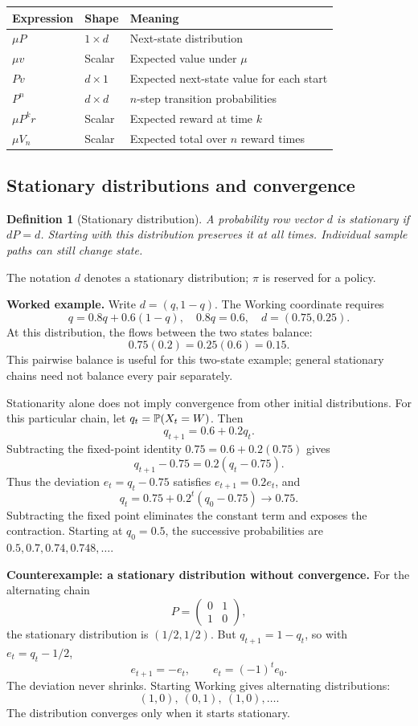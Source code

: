 \documentclass[11pt]{article}
\newtheorem{definition}{Definition}[section]
\theoremstyle{remark}\newtheorem{remark}[definition]{Remark}
\begin{document}
\begin{center}\small
\begin{tabular}{@{}lll@{}}\toprule
Expression & Shape & Meaning\\\midrule
$\mu P$ & $1\times d$ & Next-state distribution\\
$\mu v$ & Scalar & Expected value under $\mu$\\
$Pv$ & $d\times1$ & Expected next-state value for each start\\
$P^n$ & $d\times d$ & $n$-step transition probabilities\\
$\mu P^kr$ & Scalar & Expected reward at time $k$\\
$\mu V_n$ & Scalar & Expected total over $n$ reward times\\\bottomrule
\end{tabular}\end{center}

\clearpage
\subsection{Stationary distributions and convergence}
\begin{definition}[Stationary distribution]
A probability row vector $d$ is stationary if $dP=d$. Starting with this distribution preserves it at all times. Individual sample paths can still change state.
\end{definition}
The notation $d$ denotes a stationary distribution; $\pi$ is reserved for a policy.

\textbf{Worked example.} Write $d=(q,1-q)$. The Working coordinate requires
\[
q=0.8q+0.6(1-q),\quad 0.8q=0.6,\quad d=(0.75,0.25).
\]
At this distribution, the flows between the two states balance:
\[
0.75(0.2)=0.25(0.6)=0.15.
\]
This pairwise balance is useful for this two-state example; general stationary chains need not balance every pair separately.

Stationarity alone does not imply convergence from other initial distributions. For this particular chain, let $q_t=\mathbb P(X_t=W)$. Then
\[
q_{t+1}=0.6+0.2q_t.
\]
Subtracting the fixed-point identity $0.75=0.6+0.2(0.75)$ gives
\[
q_{t+1}-0.75=0.2(q_t-0.75).
\]
Thus the deviation $e_t=q_t-0.75$ satisfies $e_{t+1}=0.2e_t$, and
\[
\boxed{q_t=0.75+0.2^t(q_0-0.75)\longrightarrow0.75.}
\]
Subtracting the fixed point eliminates the constant term and exposes the contraction. Starting at $q_0=0.5$, the successive probabilities are $0.5,0.7,0.74,0.748,\ldots$.

\textbf{Counterexample: a stationary distribution without convergence.}
For the alternating chain
\[
P=\begin{pmatrix}0&1\\1&0\end{pmatrix},
\]
the stationary distribution is $(1/2,1/2)$. But $q_{t+1}=1-q_t$, so with $e_t=q_t-1/2$,
\[
e_{t+1}=-e_t,\qquad e_t=(-1)^te_0.
\]
The deviation never shrinks. Starting Working gives alternating distributions:
\[ (1,0),\ (0,1),\ (1,0),\ldots. \] The distribution converges only when it starts stationary.
\end{document}
